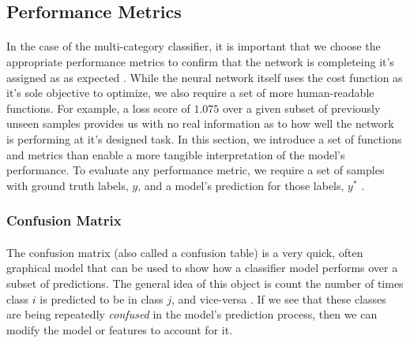 \documentclass[12pt,letterpaper]{article}
\begin{document}

\subsection{Performance Metrics}

\paragraph*{}In the case of the multi-category classifier, it is important that we choose the appropriate performance metrics to confirm that the network is completeing it's assigned as as expected \cite{Geron}. While the neural network itself uses the cost function as it's sole objective to optimize, we also require a set of more human-readable functions. For example, a loss score of $1.075$ over a given subset of previously unseen samples provides us with no real information as to how well the network is performing at it's designed task.  In this section, we introduce a set of functions and metrics than enable a more tangible interpretation of the model's performance. To evaluate any performance metric, we require a set of samples with ground truth labels, $y$, and a model's prediction for those labels, $y^*$ \cite{Goodfellow,James}.


\subsubsection{Confusion Matrix}

\paragraph*{}The confusion matrix (also called a confusion table) is a very quick, often graphical model that can be used to show how a classifier model performs over a subset of predictions. The general idea of this object is count the number of times class $i$ is predicted to be in class $j$, and vice-versa \cite{Geron}. If we see that these classes are being repeatedly \textit{confused} in the model's prediction process, then we can modify the model or features to account for it. 
\end{document}
